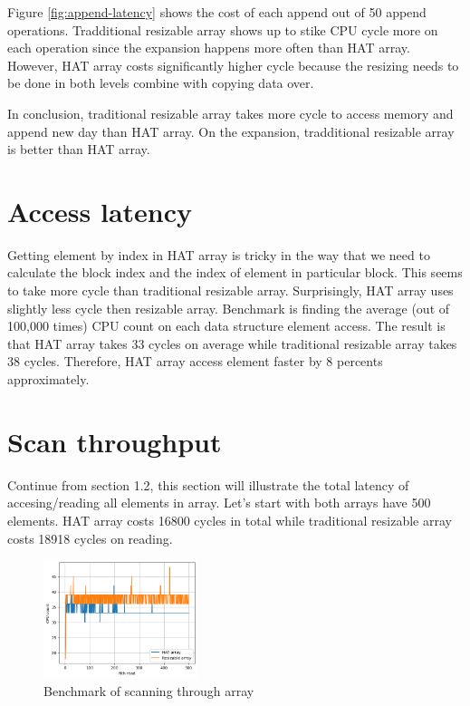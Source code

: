 \documentclass[a4paper, 12pt]{report}
\begin{document}
Figure \ref{fig:append-latency} shows the cost of each append out of 50 append operations.
Tradditional resizable array shows up to stike CPU cycle more on each operation since the expansion
happens more often than HAT array. However, HAT array costs significantly higher cycle because the 
resizing needs to be done in both levels combine with copying data over.

In conclusion, traditional resizable array takes more cycle to access memory and append new day than
HAT array. On the expansion, tradditional resizable array is better than HAT array.

\section{Access latency}

Getting element by index in HAT array is tricky in the way that we need to calculate the block index and 
the index of element in particular block. This seems to take more cycle than traditional resizable array. 
Surprisingly, HAT array uses slightly less cycle then resizable array.
Benchmark is finding the average (out of 100,000 times) CPU count on each data structure element access. The result
is that HAT array takes 33 cycles on average while traditional resizable array takes 38 cycles. Therefore,
HAT array access element faster by 8 percents approximately.

\section{Scan throughput}

Continue from section 1.2, this section will illustrate the total latency of accesing/reading all elements
in array. Let's start with both arrays have 500 elements. HAT array costs 16800 cycles in total while 
traditional resizable array costs 18918 cycles on reading.

\begin{figure}[h]
        \centering
        \includegraphics[width=0.4\textwidth,scale=0.2]{scan_output.png}
        \caption{\label{fig:scan-latency} Benchmark of scanning through array}
\end{figure}
\end{document}
